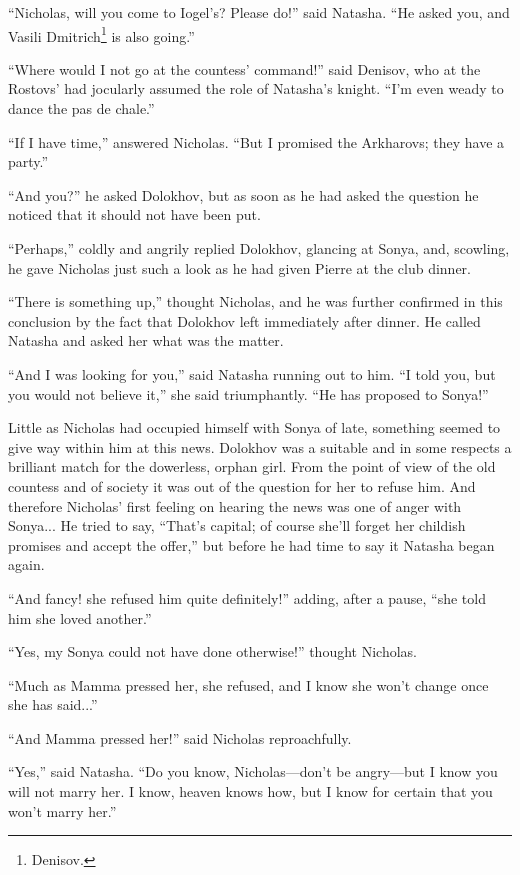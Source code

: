 ``Nicholas, will you come to Iogel's? Please do!'' said
Natasha. ``He asked you, and Vasili Dmitrich\footnote{Denisov.}
is also going.''

``Where would I not go at the countess' command!'' said Denisov,
who at the Rostovs' had jocularly assumed the role of Natasha's
knight. ``I'm even weady to dance the pas de chale.''

``If I have time,'' answered Nicholas. ``But I promised the
Arkharovs; they have a party.''

``And you?'' he asked Dolokhov, but as soon as he had asked the
question he noticed that it should not have been put.

``Perhaps,'' coldly and angrily replied Dolokhov, glancing at
Sonya, and, scowling, he gave Nicholas just such a look as he had
given Pierre at the club dinner.

``There is something up,'' thought Nicholas, and he was further
confirmed in this conclusion by the fact that Dolokhov left
immediately after dinner. He called Natasha and asked her what
was the matter.

``And I was looking for you,'' said Natasha running out to
him. ``I told you, but you would not believe it,'' she said
triumphantly. ``He has proposed to Sonya!''

Little as Nicholas had occupied himself with Sonya of late,
something seemed to give way within him at this news. Dolokhov
was a suitable and in some respects a brilliant match for the
dowerless, orphan girl. From the point of view of the old
countess and of society it was out of the question for her to
refuse him. And therefore Nicholas' first feeling on hearing the
news was one of anger with Sonya... He tried to say, ``That's
capital; of course she'll forget her childish promises and accept
the offer,'' but before he had time to say it Natasha began
again.

``And fancy! she refused him quite definitely!'' adding, after a
pause, ``she told him she loved another.''

``Yes, my Sonya could not have done otherwise!'' thought
Nicholas.

``Much as Mamma pressed her, she refused, and I know she won't
change once she has said...''

``And Mamma pressed her!'' said Nicholas reproachfully.

``Yes,'' said Natasha. ``Do you know, Nicholas---don't be
angry---but I know you will not marry her. I know, heaven knows
how, but I know for certain that you won't marry her.''

